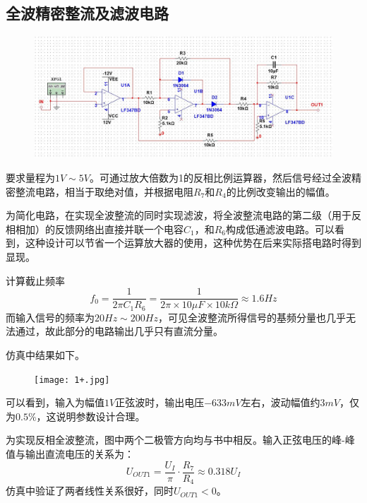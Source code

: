 \documentclass[12pt,a4paper]{article}
\begin{document}
\begin{spacing}{1.3}
\subsection{全波精密整流及滤波电路}
\begin{figure}[H]
\centering
\includegraphics[width=\textwidth]{1.jpg}
\end{figure}
要求量程为$1V\sim 5V$。可通过放大倍数为1的反相比例运算器，然后信号经过全波精密整流电路，相当于取绝对值，并根据电阻$R_7和R_4$的比例改变输出的幅值。\par
为简化电路，在实现全波整流的同时实现滤波，将全波整流电路的第二级（用于反相相加）的反馈网络出直接并联一个电容$C_1，和R_6$构成低通滤波电路。可以看到，这种设计可以节省一个运算放大器的使用，这种优势在后来实际搭电路时得到显现。\par 计算截止频率
\[f_0=\frac{1}{2\pi C_1 R_6}=\frac{1}{2\pi \times 10\mu F \times 10k\Omega} \approx 1.6Hz\]
而输入信号的频率为$20Hz\sim 200Hz$，可见全波整流所得信号的基频分量也几乎无法通过，故此部分的电路输出几乎只有直流分量。\par 仿真中结果如下。
\begin{figure}[H]
\centering
\texttt{[image: 1+.jpg]}
\end{figure}
可以看到，输入为幅值$1V$正弦波时，输出电压$-633mV$左右，波动幅值约$3mV$，仅为$0.5\%$，这说明参数设计合理。\par 
为实现反相全波整流，图中两个二极管方向均与书中相反。输入正弦电压的峰-峰值与输出直流电压的关系为：
\[U_{OUT1} = \frac{U_I}{\pi} \cdot \frac{R_7}{R_4} \approx 0.318 U_I\]
仿真中验证了两者线性关系很好，同时$U_{OUT1}<0$。

\end{spacing}
\end{document}
